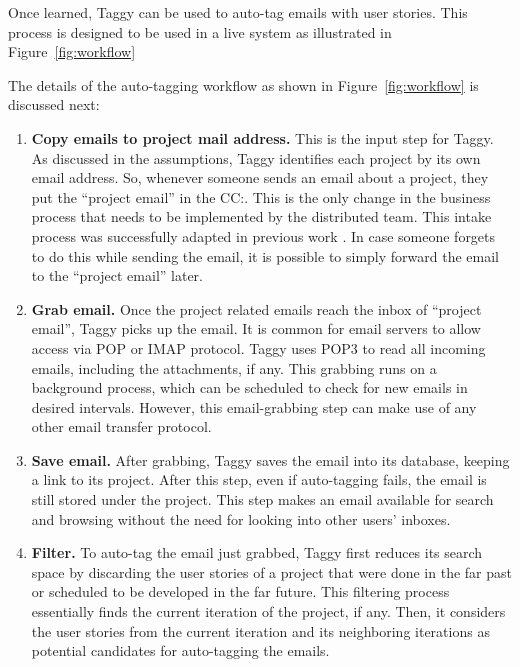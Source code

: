 Once learned, Taggy can be used to auto-tag emails with user stories. This process is designed to be used in a live system as illustrated in Figure~\ref{fig:workflow}

The details of the auto-tagging workflow as shown in Figure~\ref{fig:workflow} is discussed next:

\begin{enumerate}
	\item \textbf{Copy emails to project mail address.} This is the input step for Taggy. As discussed in the assumptions, Taggy identifies each project by its own email address. So, whenever someone sends an email about a project, they put the ``project email'' in the CC:. This is the only change in the business process that needs to be implemented by the distributed team. This intake process was successfully adapted in previous work \cite{where_did_you}. In case someone forgets to do this while sending the email, it is possible to simply forward the email to the ``project email'' later.
	
	\item \textbf{Grab email.} Once the project related emails reach the inbox of ``project email'', Taggy picks up the email. It is common for email servers to allow access via POP or IMAP protocol. Taggy uses POP3 to read all incoming emails, including the attachments, if any. This grabbing runs on a background process, which can be scheduled to check for new emails in desired intervals. However, this email-grabbing step can make use of any other email transfer protocol.

	\item \textbf{Save email.} After grabbing, Taggy saves the email into its database, keeping a link to its project. After this step, even if auto-tagging fails, the email is still stored under the project. This step makes an email available for search and browsing without the need for looking into other users' inboxes.
	
	\item \textbf{Filter.} To auto-tag the email just grabbed, Taggy first reduces its search space by discarding the user stories of a project that were done in the far past or scheduled to be developed in the far future. This filtering process essentially finds the current iteration of the project, if any. Then, it considers the user stories from the current iteration and its neighboring iterations as potential candidates for auto-tagging the emails.


\end{enumerate}
